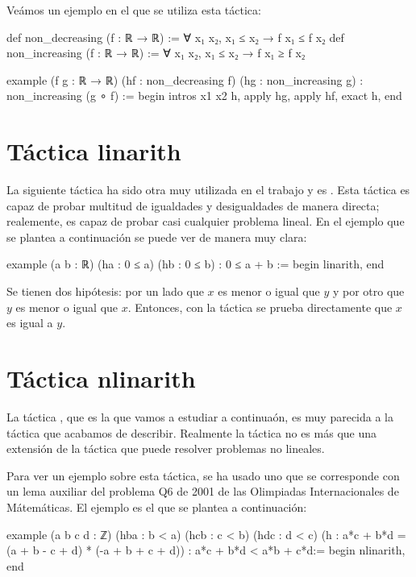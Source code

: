 Veámos un ejemplo en el que se utiliza esta táctica:
\begin{leancode}
def non_decreasing (f : ℝ → ℝ) := ∀ x₁ x₂, x₁ ≤ x₂ → f x₁ ≤ f x₂
def non_increasing (f : ℝ → ℝ) := ∀ x₁ x₂, x₁ ≤ x₂ → f x₁ ≥ f x₂

example (f g : ℝ → ℝ) (hf : non_decreasing f) (hg : non_increasing g) :
non_increasing (g ∘ f) :=
begin
  intros x1 x2 h,
  apply hg,
  apply hf,
  exact h,
end
\end{leancode}

\section{Táctica linarith}

La siguiente táctica ha sido otra muy utilizada en el trabajo y es
. Esta táctica es capaz de probar multitud de
igualdades y desigualdades de manera directa; realemente, es capaz de probar
casi cualquier problema lineal. En el ejemplo que se plantea a continuación
se puede ver de manera muy clara:

\begin{leancode}
example (a b : ℝ) (ha : 0 ≤ a) (hb : 0 ≤ b) : 0 ≤ a + b :=
begin
  linarith,
end
\end{leancode}

Se tienen dos hipótesis: por un lado que \(x\) es menor o igual que \(y\) y por
otro que \(y\) es menor o igual que \(x\). Entonces, con la táctica
 se prueba directamente que \(x\) es igual a \(y\).


\section{Táctica nlinarith}

La táctica , que es la que vamos a estudiar a
continuaón, es muy parecida a la táctica  que
acabamos de describir. Realmente la táctica  no
es más que una extensión de la táctica  que puede
resolver problemas no lineales.

Para ver un ejemplo sobre esta táctica, se ha usado uno que se corresponde con
un lema auxiliar del problema Q6 de 2001 de las Olimpiadas Internacionales de
Mátemáticas. El ejemplo es el que se plantea a continuación:

\begin{leancode}
example (a b c d : ℤ)
  (hba : b < a)
  (hcb : c < b)
  (hdc : d < c)
  (h : a*c + b*d = (a + b - c + d) * (-a + b + c + d))
  : a*c + b*d < a*b + c*d:=
begin
  nlinarith,
end
\end{leancode}

